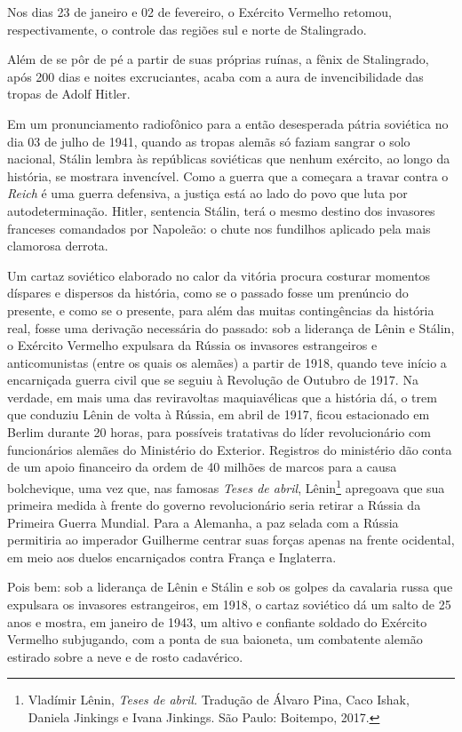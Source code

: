 Nos dias 23 de janeiro e 02 de fevereiro, o Exército Vermelho retomou,
respectivamente, o controle das regiões sul e norte de Stalingrado.

Além de se pôr de pé a partir de suas próprias ruínas, a fênix de
Stalingrado, após 200 dias e noites excruciantes, acaba com a aura de
invencibilidade das tropas de Adolf Hitler.

Em um pronunciamento radiofônico para a então desesperada pátria
soviética no dia 03 de julho de 1941, quando as tropas alemãs só faziam
sangrar o solo nacional, Stálin lembra às repúblicas soviéticas que
nenhum exército, ao longo da história, se mostrara invencível. Como a
guerra que a  começara a travar contra o  \emph{Reich} é uma
guerra defensiva, a justiça está ao lado do povo que luta por
autodeterminação. Hitler, sentencia Stálin, terá o mesmo destino dos
invasores franceses comandados por Napoleão: o chute nos fundilhos
aplicado pela mais clamorosa derrota.

Um cartaz soviético elaborado no calor da vitória procura costurar
momentos díspares e dispersos da história, como se o passado fosse um
prenúncio do presente, e como se o presente, para além das muitas
contingências da história real, fosse uma derivação necessária do
passado: sob a liderança de Lênin e Stálin, o Exército Vermelho
expulsara da Rússia os invasores estrangeiros e anticomunistas (entre os
quais os alemães) a partir de 1918, quando teve início a encarniçada
guerra civil que se seguiu à Revolução de Outubro de 1917. Na verdade,
em mais uma das reviravoltas maquiavélicas que a história dá, o trem que
conduziu Lênin de volta à Rússia, em abril de 1917, ficou estacionado em
Berlim durante 20 horas, para possíveis tratativas do líder
revolucionário com funcionários alemães do Ministério do Exterior.
Registros do ministério dão conta de um apoio financeiro da ordem de 40
milhões de marcos para a causa bolchevique, uma vez que, nas famosas
\emph{Teses de abril}, Lênin\footnote{Vladímir Lênin, \emph{Teses de
  abril.} Tradução de Álvaro Pina, Caco Ishak, Daniela Jinkings e Ivana
  Jinkings. São Paulo: Boitempo, 2017.} apregoava que sua primeira
medida à frente do governo revolucionário seria retirar a Rússia da
Primeira Guerra Mundial. Para a Alemanha, a paz selada com a Rússia
permitiria ao imperador Guilherme  centrar suas forças apenas na
frente ocidental, em meio aos duelos encarniçados contra França e
Inglaterra.

Pois bem: sob a liderança de Lênin e Stálin e sob os golpes da cavalaria
russa que expulsara os invasores estrangeiros, em 1918, o cartaz
soviético dá um salto de 25 anos e mostra, em janeiro de 1943, um altivo
e confiante soldado do Exército Vermelho subjugando, com a ponta de sua
baioneta, um combatente alemão estirado sobre a neve e de rosto
cadavérico.

